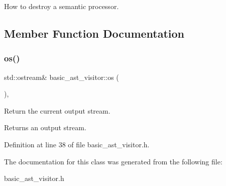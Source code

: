 How to destroy a semantic processor. 

\subsection{Member Function Documentation}
\mbox{\label{classbasic__ast__visitor_ab81ab147fe687470c3e8f9ebfd2ca6f9}} 
\subsubsection{os()}
{\footnotesize\ttfamily std\+::ostream\& basic\+\_\+ast\+\_\+visitor\+::os (\begin{DoxyParamCaption}{ }\end{DoxyParamCaption})\hspace{0.3cm}{\ttfamily [inline]}, {\ttfamily [protected]}}

Return the current output stream. \begin{DoxyReturn}{Returns}
an output stream. 
\end{DoxyReturn}


Definition at line 38 of file basic\+\_\+ast\+\_\+visitor.\+h.



The documentation for this class was generated from the following file\+:\begin{DoxyCompactItemize}
\item 
basic\+\_\+ast\+\_\+visitor.\+h\end{DoxyCompactItemize}
